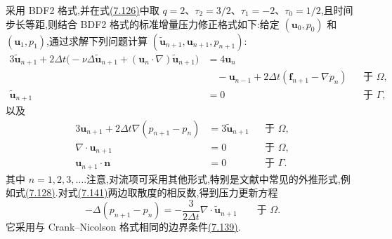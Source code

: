 \begin{example}\label{ex:incremental-pressure-correction-bdf2}
采用 BDF2 格式,并在式\hyperref[eq:projection-q-step-time-derivative]{(7.126)}中取
$q=2$、$\tau_2=3/2$、$\tau_1=-2$、$\tau_0=1/2$,且时间步长等距,则结合 BDF2 格式的标准增量压力修正格式如下:给定 $(\bm{u}_0,p_0)$ 和 $(\bm{u}_1,p_1)$,通过求解下列问题计算 $(\widetilde{\bm{u}}_{n+1},\bm{u}_{n+1},p_{n+1})$:
\begingroup
\small
\begin{equation}\label{eq:incremental-pressure-correction-bdf2-velocity}
\begin{aligned}
 3\widetilde{\bm{u}}_{n+1}
 +2\Delta t\bigl(-\nu\Delta\widetilde{\bm{u}}_{n+1}
   +(\bm{u}_n\cdot\nabla)\widetilde{\bm{u}}_{n+1}\bigr)
 &=4\bm{u}_n\\
 &\quad-\bm{u}_{n-1}
   +2\Delta t(\bm{f}_{n+1}-\nabla p_n)
     &&\text{于 }\Omega,\\
 \widetilde{\bm{u}}_{n+1}&=0
     &&\text{于 }\Gamma,
\end{aligned}
\end{equation}
\endgroup
以及
\begin{equation}\label{eq:incremental-pressure-correction-bdf2-update}
\begin{aligned}
 3\bm{u}_{n+1}
 +2\Delta t\nabla(p_{n+1}-p_n)
   &=3\widetilde{\bm{u}}_{n+1}
     &&\text{于 }\Omega,\\
 \nabla\cdot\bm{u}_{n+1}&=0
     &&\text{于 }\Omega,\\
 \bm{u}_{n+1}\cdot\bm{n}&=0
     &&\text{于 }\Gamma.
\end{aligned}
\end{equation}
其中 $n=1,2,3,\ldots$.注意,对流项可采用其他形式,特别是文献中常见的外推形式,例如式\hyperref[eq:projection-convection-extrapolation]{(7.128)}.对式\hyperref[eq:incremental-pressure-correction-bdf2-update]{(7.141)}两边取散度的相反数,得到压力更新方程
\begin{equation}\label{eq:incremental-pressure-poisson-bdf2}
 -\Delta(p_{n+1}-p_n)
 =-\frac{3}{2\Delta t}
   \nabla\cdot\widetilde{\bm{u}}_{n+1}
   \qquad\text{于 }\Omega.
\end{equation}
它采用与 Crank--Nicolson 格式相同的边界条件\hyperref[eq:incremental-pressure-neumann-cn]{(7.139)}.
\end{example}

